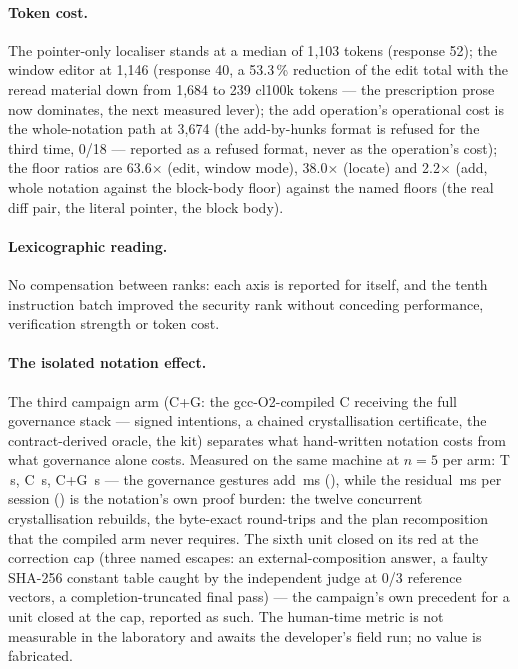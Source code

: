 \documentclass[11pt,a4paper]{article}
\begin{document}
\paragraph{Token cost.} The pointer-only localiser stands at a median
of 1{,}103 tokens (response 52); the window editor at 1{,}146
(response 40, a 53.3\,\% reduction of the edit total with the reread
material down from 1{,}684 to 239 cl100k tokens --- the prescription
prose now dominates, the next measured lever); the add operation's
operational cost is the whole-notation path at 3{,}674 (the
add-by-hunks format is refused for the third time, 0/18 --- reported
as a refused format, never as the operation's cost); the floor
ratios are 63.6$\times$ (edit, window mode), 38.0$\times$ (locate) and
2.2$\times$ (add, whole notation against the block-body floor) against
the named floors (the real diff pair, the literal pointer, the block
body).

\paragraph{Lexicographic reading.} No compensation between ranks: each
axis is reported for itself, and the tenth instruction batch improved
the security rank without conceding performance, verification
strength or token cost.

\paragraph{The isolated notation effect.} The third campaign arm
(C+G: the gcc-O2-compiled C receiving the full governance stack ---
signed intentions, a chained crystallisation certificate, the
contract-derived oracle, the kit) separates what hand-written
notation costs from what governance alone costs. Measured on the same
machine at $n{=}5$ per arm: T \cgMquatreT{}\,s, C \cgMquatreC{}\,s,
C+G \cgMquatreCG{}\,s --- the governance gestures add
\cgEffetGouvernanceMs{}\,ms (\cgEffetGouvernanceRatio{}), while the
residual \cgEffetNotationMs{}\,ms per session
(\cgEffetNotationRatio{}) is the notation's own proof burden: the
twelve concurrent crystallisation rebuilds, the byte-exact
round-trips and the plan recomposition that the compiled arm never
requires. The sixth unit closed on its red at the correction cap
(three named escapes: an external-composition answer, a faulty
SHA-256 constant table caught by the independent judge at 0/3
reference vectors, a completion-truncated final pass) --- the
campaign's own precedent for a unit closed at the cap, reported as
such. The human-time metric is not measurable in the laboratory and
awaits the developer's field run; no value is fabricated.
\end{document}

